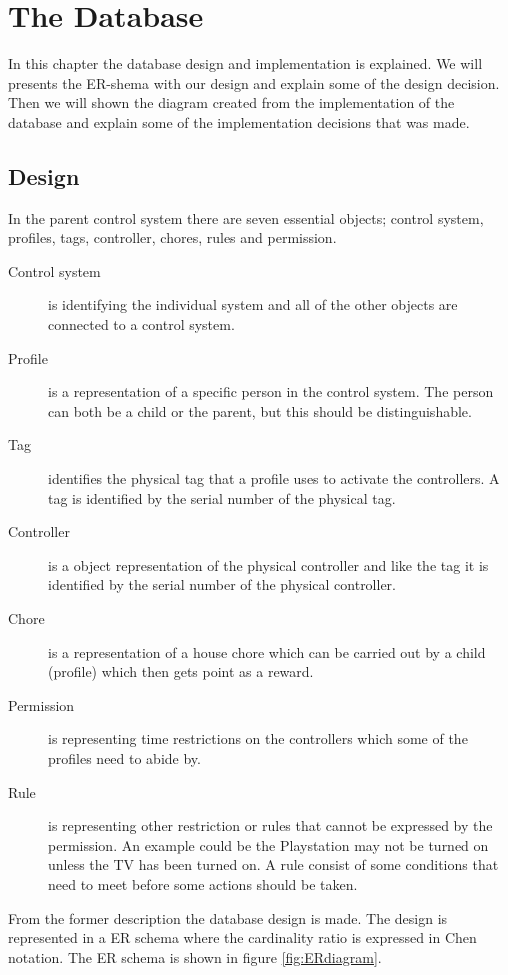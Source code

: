 \chapter{The Database}
\label{chap:database} 
In this chapter the database design and implementation is explained. We will presents the ER-shema with our design and explain some of the design decision. Then we will shown the diagram created from the implementation of the database and explain some of the implementation decisions that was made. 
  
\section{Design}
\label{sec:DBdesign}
In the parent control system there are seven essential objects; control system, profiles, tags, controller, chores, rules and permission. 

\begin{description}
	\item[Control system] is identifying the individual system and all of the other objects are connected to a control system.
	\item[Profile] is a representation of a specific person in the control system. The person can both be a child or the parent, but this should be distinguishable.
	\item[Tag] identifies the physical tag that a profile uses to activate the controllers. A tag is identified by the serial number of the physical tag.
	\item[Controller]	is a object representation of the physical controller and like the tag it is identified by the serial number of the physical controller.
	\item[Chore] is a representation of a house chore which can be carried out by a child (profile) which then gets point as a reward.
	\item[Permission] is representing time restrictions on the controllers which some of the profiles need to abide by. 
	\item[Rule] is representing other restriction or rules that cannot be expressed by the permission. An example could be the Playstation may not be turned on unless the TV has been turned on. A rule consist of some conditions that need to meet before some actions should be taken. 
\end{description}

From the former description the database design is made. The design is represented in a ER schema where the cardinality ratio is expressed in 
Chen notation. The ER schema is shown in figure \ref{fig:ERdiagram}. 

